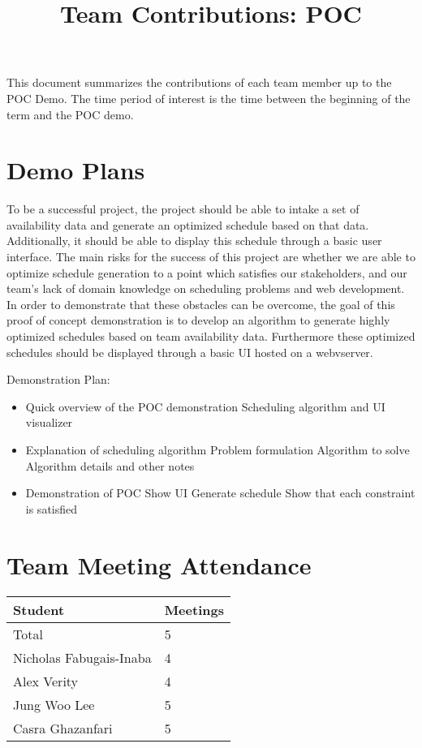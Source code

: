 \documentclass{article}
\title{Team Contributions: POC\\\progname}
\author{\authname}
\date{}
\begin{document}
\maketitle

This document summarizes the contributions of each team member up to the POC
Demo.  The time period of interest is the time between the beginning of the term
and the POC demo.

\section{Demo Plans}

To be a successful project, the project should be able to intake a set of 
availability data and generate an optimized schedule based on that data. 
Additionally, it should be able to display this schedule through a basic
user interface. The main risks for the success of this project are whether 
we are able to optimize schedule generation to a point which satisfies our 
stakeholders, and our team's lack of domain knowledge on scheduling problems 
and web development. \\

In order to demonstrate that these obstacles can be 
overcome, the goal of this proof of concept demonstration is to develop
an algorithm to generate highly optimized schedules based on team availability 
data. Furthermore these optimized schedules should be displayed through a 
basic UI hosted on a webvserver.

Demonstration Plan:
\begin{itemize}
  \item Quick overview of the POC demonstration
    \subitem Scheduling algorithm and UI visualizer
  \item Explanation of scheduling algorithm
    \subitem Problem formulation
    \subitem Algorithm to solve
    \subitem Algorithm details and other notes
  \item Demonstration of POC
    \subitem Show UI
    \subitem Generate schedule
    \subitem Show that each constraint is satisfied
\end{itemize}

\section{Team Meeting Attendance}

\begin{table}[H]
\centering
\begin{tabular}{ll}
\toprule
\textbf{Student} & \textbf{Meetings}\\
\midrule
Total & 5\\
Nicholas Fabugais-Inaba & 4 \\
Alex Verity & 4 \\
Jung Woo Lee & 5 \\
Casra Ghazanfari & 5 \\
\bottomrule
\end{tabular}
\end{table}
\end{document}
